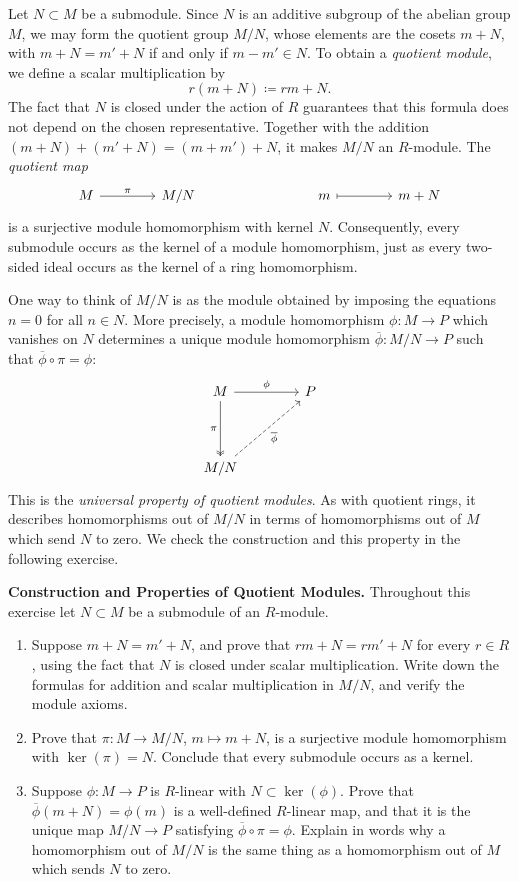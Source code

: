 \documentclass[12pt,reqno]{amsart}
\begin{document}
\hrulefill


Let $N\subset M$ be a submodule. Since $N$ is an additive subgroup of the abelian group $M$, we may form the quotient group $M/N$, whose elements are the cosets $m+N$, with $m+N=m'+N$ if and only if $m-m'\in N$. To obtain a \emph{quotient module}, we define a scalar multiplication by
\[
 r(m+N)\coloneqq rm+N.
\]
The fact that $N$ is closed under the action of $R$ guarantees that this formula does not depend on the chosen representative. Together with the addition $(m+N)+(m'+N)=(m+m')+N$, it makes $M/N$ an $R$-module. The \emph{quotient map}
\[
\begin{tikzcd}[row sep=.3em,column sep=4em]
M \arrow[r,"\pi"] & M/N & & m \arrow[r,mapsto] & m+N
\end{tikzcd}
\]
is a surjective module homomorphism with kernel $N$. Consequently, every submodule occurs as the kernel of a module homomorphism, just as every two-sided ideal occurs as the kernel of a ring homomorphism.

One way to think of $M/N$ is as the module obtained by imposing the equations $n=0$ for all $n\in N$. More precisely, a module homomorphism $\phi:M\to P$ which vanishes on $N$ determines a unique module homomorphism $\overline{\phi}:M/N\to P$ such that $\overline{\phi}\circ \pi=\phi$:
\[
\begin{tikzcd}[column sep=4em,row sep=4em]
M \arrow[r,"\phi"] \arrow[d,two heads,"\pi"'] & P \\
M/N \arrow[ur,dashed,"\overline{\phi}"'] &
\end{tikzcd}
\]
This is the \emph{universal property of quotient modules}. As with quotient rings, it describes homomorphisms out of $M/N$ in terms of homomorphisms out of $M$ which send $N$ to zero. We check the construction and this property in the following exercise.

\hrulefill

\begin{problems}
\item\label{m:quotient} \textbf{Construction and Properties of Quotient Modules.} Throughout this exercise let $N\subset M$ be a submodule of an $R$-module.
\begin{enumerate}
\item Suppose $m+N=m'+N$, and prove that $rm+N=rm'+N$ for every $r\in R$, using the fact that $N$ is closed under scalar multiplication. Write down the formulas for addition and scalar multiplication in $M/N$, and verify the module axioms.
\item Prove that $\pi:M\to M/N$, $m\mapsto m+N$, is a surjective module homomorphism with $\ker(\pi)=N$. Conclude that every submodule occurs as a kernel.
\item Suppose $\phi:M\to P$ is $R$-linear with $N\subset\ker(\phi)$. Prove that $\overline{\phi}(m+N)=\phi(m)$ is a well-defined $R$-linear map, and that it is the unique map $M/N\to P$ satisfying $\overline{\phi}\circ \pi=\phi$. Explain in words why a homomorphism out of $M/N$ is the same thing as a homomorphism out of $M$ which sends $N$ to zero.
\end{enumerate}
\end{problems}
\end{document}
